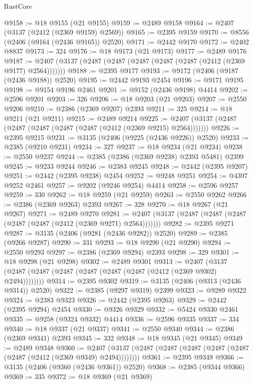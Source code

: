 \begin{lexlean}{RustCore}
\begin{coremodule}
@9158 := @18 @9155 (@21 @9155)
@9159 := @2489 @9158
@9164 := @2407 (@3137 (@2412 (@2369 @9159) @2569))
@9165 := @2395 @9159
@9170 := @8556 (@2406 (@9164 (@2436 @9165)) @2520)
@9171 := @2442 @9170
@9172 := @2402 @8837
@9173 := 324
@9176 := @18 @9173 (@21 @9173)
@9177 := @2489 @9176
@9187 := @2407 (@3137 (@2487 (@2487 (@2487 (@2487 (@2487 (@2412 (@2369 @9177) @2564)))))))
@9188 := @2395 @9177
@9193 := @9172 (@2406 (@9187 (@2436 @9188)) @2520)
@9195 := @2442 @9193 @2454
@9196 := @9171 @9195
@9198 := @9154 @9196 @2461
@9201 := @9152 (@2436 @9198) @4414
@9202 := @2596 @9201
@9203 := 326
@9206 := @18 @9203 (@21 @9203)
@9207 := @2550 @9206
@9210 := @2386 (@2369 @9207) @2393
@9211 := 325
@9214 := @18 @9211 (@21 @9211)
@9215 := @2489 @9214
@9225 := @2407 (@3137 (@2487 (@2487 (@2487 (@2487 (@2487 (@2412 (@2369 @9215) @2564)))))))
@9226 := @2395 @9215
@9231 := @3135 (@2406 (@9225 (@2436 @9226)) @2520)
@9233 := @2385 (@9210 @9231)
@9234 := 327
@9237 := @18 @9234 (@21 @9234)
@9238 := @2550 @9237
@9244 := @2385 (@2386 (@2369 @9238) @2393 @5481) @2399
@9245 := @9233 @9244
@9246 := @2383 @9245
@9248 := @2442 (@2395 @9207)
@9251 := @2442 (@2395 @9238) @2454
@9252 := @9248 @9251
@9254 := @4397 @9252 @2461
@9257 := @9202 (@9246 @9254) @4414
@9258 := @2596 @9257
@9259 := 330
@9262 := @18 @9259 (@21 @9259)
@9263 := @2550 @9262
@9266 := @2386 (@2369 @9263) @2393
@9267 := 328
@9270 := @18 @9267 (@21 @9267)
@9271 := @2489 @9270
@9281 := @2407 (@3137 (@2487 (@2487 (@2487 (@2487 (@2487 (@2412 (@2369 @9271) @2564)))))))
@9282 := @2395 @9271
@9287 := @3135 (@2406 (@9281 (@2436 @9282)) @2520)
@9289 := @2385 (@9266 @9287)
@9290 := 331
@9293 := @18 @9290 (@21 @9290)
@9294 := @2550 @9293
@9297 := @2386 (@2369 @9294) @2393
@9298 := 329
@9301 := @18 @9298 (@21 @9298)
@9302 := @2489 @9301
@9313 := @2407 (@3137 (@2487 (@2487 (@2487 (@2487 (@2487 (@2487 (@2412 (@2369 @9302) @2494))))))))
@9314 := @2395 @9302
@9319 := @3135 (@2406 (@9313 (@2436 @9314)) @2520)
@9322 := @2385 (@9297 @9319) @2399
@9323 := @9289 @9322
@9324 := @2383 @9323
@9326 := @2442 (@2395 @9263)
@9329 := @2442 (@2395 @9294) @2454
@9330 := @9326 @9329
@9332 := @5424 @9330 @2461
@9335 := @9258 (@9324 @9332) @4414
@9336 := @2596 @9335
@9337 := 334
@9340 := @18 @9337 (@21 @9337)
@9341 := @2550 @9340
@9344 := @2386 (@2369 @9341) @2393
@9345 := 332
@9348 := @18 @9345 (@21 @9345)
@9349 := @2489 @9348
@9360 := @2407 (@3137 (@2487 (@2487 (@2487 (@2487 (@2487 (@2487 (@2412 (@2369 @9349) @2494))))))))
@9361 := @2395 @9349
@9366 := @3135 (@2406 (@9360 (@2436 @9361)) @2520)
@9368 := @2385 (@9344 @9366)
@9369 := 335
@9372 := @18 @9369 (@21 @9369)

\end{coremodule}
\end{lexlean}
